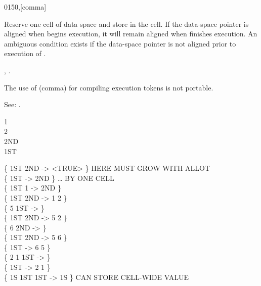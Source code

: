 \begin{worddef}{0150}{,}[comma]
\item {}

	Reserve one cell of data space and store  in the cell.
	If the data-space pointer is aligned when \word{,} begins
	execution, it will remain aligned when \word{,} finishes
	execution. An ambiguous condition exists if the data-space
	pointer is not aligned prior to execution of \word{,}.

\see {},
	.

	\begin{defer}
	\rationale %
		The use of \word{,} (comma) for compiling execution tokens is
		not portable.

		See: .

	\testing
		 1 \word{,} \\
		 2 \word{,} \\
		 2ND \\
		 1ST

		\{ 1ST 2ND  -> <TRUE> \}	\tab {} HERE MUST GROW WITH ALLOT \\
		\{ 1ST  -> 2ND \}			\tab[2.6]  {\ldots} BY ONE CELL \\
		\{ 1ST 1  \word{+} -> 2ND \} \\
		\{ 1ST  2ND  -> 1 2 \} \\
		\{ 5 1ST \word{!} -> \} \\
		\{ 1ST  2ND  -> 5 2 \} \\
		\{ 6 2ND \word{!} -> \} \\
		\{ 1ST  2ND  -> 5 6 \} \\
		\{ 1ST  -> 6 5 \} \\
		\{ 2 1 1ST  -> \} \\
		\{ 1ST  -> 2 1 \} \\
		\{ 1S 1ST \word{!}  1ST  -> 1S \} \tab {} CAN STORE CELL-WIDE VALUE
	\end{defer}
\end{worddef}


